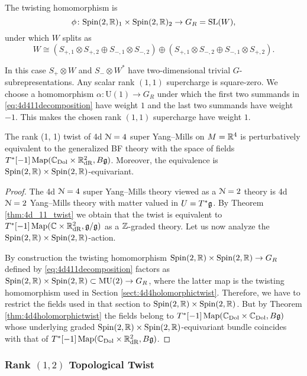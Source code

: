 \documentclass[10pt, oneside]{article}
\newcommand{\MU}{\mathrm{MU}}
\renewcommand{\U}{\mathrm{U}}
\begin{document}
The twisting homomorphism is
\[
\phi \colon \mathrm{Spin}(2, \mathbb R)_1 \times \mathrm{Spin}(2, \mathbb R)_2 \to G_R=\mathrm{SL}(W),
\]
under which $W$ splits as
\begin{equation}
W\cong (S_{+, 1}\otimes S_{+, 2}\oplus S_{-, 1}\otimes S_{-, 2})\oplus (S_{+, 1}\otimes S_{-, 2}\oplus S_{-, 1}\otimes S_{+, 2}).
\label{eq:4d411decomposition}
\end{equation}

In this case $S_+\otimes W$ and $S_-\otimes W^*$ have two-dimensional trivial $G$-subrepresentations. Any scalar rank $(1, 1)$ supercharge is square-zero. We choose a homomorphism $\alpha\colon \U(1)\rightarrow G_R$ under which the first two summands in \eqref{eq:4d411decomposition} have weight $1$ and the last two summands have weight $-1$. This makes the chosen rank $(1, 1)$ supercharge have weight $1$.

\begin{theorem}
The rank (1, 1) twist of 4d $\mathcal N=4$ super Yang--Mills on $M=\mathbb R^4$ is perturbatively equivalent to the generalized BF theory with the space of fields $T^*[-1] \operatorname{Map}(\mathbb C_{\rm Dol}\times \mathbb R^2_{\mathrm{dR}}, B \mathfrak g)$. Moreover, the equivalence is $\mathrm{Spin}(2, \mathbb R)\times \mathrm{Spin}(2, \mathbb R)$-equivariant.
\label{thm:4d4partialtwist}
\end{theorem}
\begin{proof}
The 4d $\mathcal N=4$ super Yang--Mills theory viewed as a $\mathcal N=2$ theory is 4d $\mathcal N=2$ Yang--Mills theory with matter valued in $U=T^*\mathfrak g$. By Theorem \ref{thm:4d_11_twist} we obtain that the twist is equivalent to $T^*[-1]\operatorname{Map}(\mathbb C\times \mathbb R^2_{\mathrm{dR}}, \mathfrak g/\mathfrak g)$ as a $\mathbb Z$-graded theory. Let us now analyze the $\mathrm{Spin}(2, \mathbb R)\times \mathrm{Spin}(2, \mathbb R)$-action.

By construction the twisting homomorphism $\mathrm{Spin}(2,\mathbb R)\times \mathrm{Spin}(2, \mathbb R)\rightarrow G_R$ defined by \eqref{eq:4d411decomposition} factors as $\Spin(2, \RR)\times \Spin(2, \RR)\subset \MU(2)\rightarrow G_R$, where the latter map is the twisting homomorphism used in Section \ref{sect:4d4holomorphictwist}. Therefore, we have to restrict the fields used in that section to $\mathrm{Spin}(2, \mathbb R)\times \mathrm{Spin}(2, \mathbb R)$. But by Theorem \ref{thm:4d4holomorphictwist} the fields belong to $T^*[-1]\operatorname{Map}(\mathbb C_{\rm Dol}\times \mathbb C_{\rm Dol}, B\mathfrak g)$ whose underlying graded $\mathrm{Spin}(2, \mathbb R)\times \mathrm{Spin}(2, \mathbb R)$-equivariant bundle coincides with that of $T^*[-1]\operatorname{Map}(\mathbb C_{\rm Dol}\times \mathbb R^2_{\mathrm{dR}}, B\mathfrak g)$.
\end{proof}

\subsubsection{Rank \texorpdfstring{$(1, 2)$}{(1,2)} Topological Twist}
\end{document}
